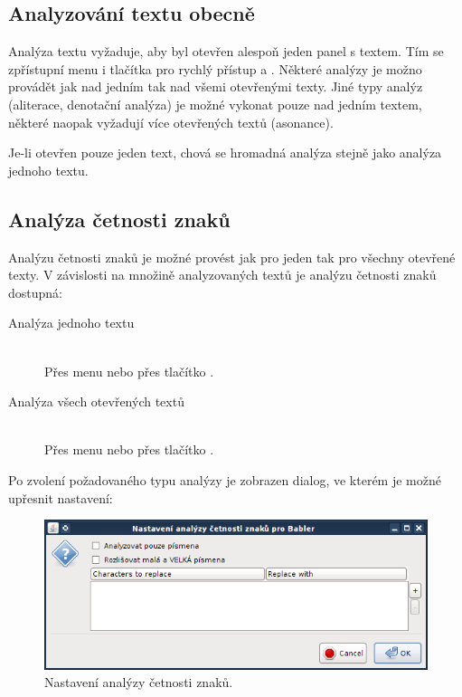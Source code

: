 \documentclass[dp.tex]{subfiles}
\begin{document}
\subsection{Analyzování textu obecně}

Analýza textu vyžaduje, aby byl otevřen alespoň jeden panel s textem. Tím se zpřístupní menu  i tlačítka pro rychlý přístup  a .  Některé analýzy je možno provádět jak nad jedním tak nad všemi otevřenými texty. Jiné typy analýz (aliterace, denotační analýza) je možné vykonat pouze nad jedním textem, některé naopak vyžadují více otevřených textů (asonance).

Je-li otevřen pouze jeden text, chová se hromadná analýza stejně jako analýza jednoho textu.

\subsection{Analýza četnosti znaků}

Analýzu četnosti znaků je možné provést jak pro jeden tak pro všechny otevřené texty. V závislosti na množině analyzovaných textů je analýzu četnosti znaků dostupná:
\begin{description}
  \item[Analýza jednoho textu] \hfill \\
	Přes menu  nebo přes tlačítko .
  \item[Analýza všech otevřených textů] \hfill \\
	Přes menu  nebo přes tlačítko .
\end{description}

Po zvolení požadovaného typu analýzy je zobrazen dialog, ve kterém je možné upřesnit nastavení:

\begin{figure}[H]
\centering
\includegraphics[max width=\textwidth,keepaspectratio=true]{imgs-60-aplikace/gui-character-analysis-dialog}
\caption{Nastavení analýzy četnosti znaků.}
\label{fig:gui-character-analysis-dialog}
\end{figure}
\end{document}
